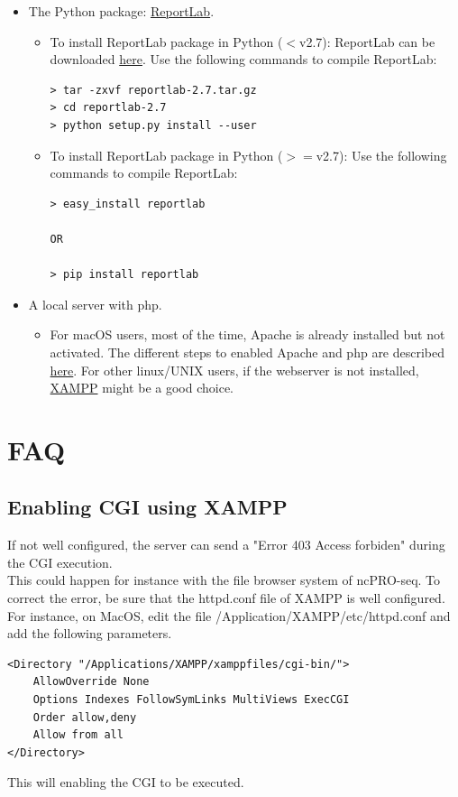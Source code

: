 \documentclass[12pt]{article}
\def \ncpip{ncPRO-seq}
\begin{document}
\begin{itemize}
 \item The Python package: \href{http://www.reportlab.com/opensource/}{ ReportLab}.

\begin{itemize}
 \item To install ReportLab package in Python ($<$v2.7): ReportLab can be downloaded \href{https://pypi.python.org/packages/source/r/reportlab/reportlab-2.7.tar.gz}{ here}. Use the following commands to compile ReportLab:
\begin{verbatim}
> tar -zxvf reportlab-2.7.tar.gz
> cd reportlab-2.7
> python setup.py install --user
\end{verbatim}
 \item To install ReportLab package in Python ($>=$v2.7): Use the following commands to compile ReportLab:
\begin{verbatim}
> easy_install reportlab

OR

> pip install reportlab
\end{verbatim}
\end{itemize}

 \item A local server with php.

\begin{itemize}
 \item For macOS users, most of the time, Apache is already installed but not activated. The different steps to enabled Apache and php are described \href{http://www.procata.com/blog/archives/2007/10/28/working-with-php-5-in-mac-os-x-105}{ here}. For other linux/UNIX users, if the webserver is not installed, \href{http://www.apachefriends.org/en/xampp.html}{ XAMPP} might be a good choice.
\end{itemize}

\end{itemize}

\section{FAQ}
\subsection{Enabling CGI using XAMPP}
If not well configured, the server can send a "Error 403 Access forbiden" during the CGI execution.\\
This could happen for instance with the file browser system of \ncpip{}. To correct the error, be sure that the httpd.conf file of XAMPP is well configured.
For instance, on MacOS, edit the file /Application/XAMPP/etc/httpd.conf and add the following parameters.
\begin{verbatim}
<Directory "/Applications/XAMPP/xamppfiles/cgi-bin/">
    AllowOverride None
    Options Indexes FollowSymLinks MultiViews ExecCGI
    Order allow,deny
    Allow from all
</Directory>
\end{verbatim}
This will enabling the CGI to be executed.
\end{document}

